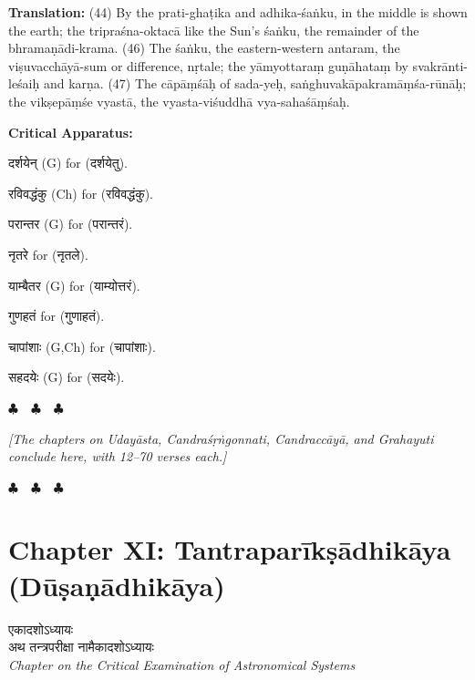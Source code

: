 \documentclass[11pt,a4paper]{article}
\newcommand{\dev}[1]{{\devanagarifont #1}}
\newenvironment{variants}{%
  \small%
  \color{varecolor}%
  \list{}{\leftmargin=2em\itemindent=-1em}%
}{\endlist}
\newcommand{\chapterend}{%
  \begin{center}%
  \textcolor{endmarkcolor}{$\clubsuit$~~$\clubsuit$~~$\clubsuit$}%
  \end{center}%
}
\begin{document}
\textbf{Translation:} (44) By the prati-ghaṭika and adhika-śaṅku, in the middle 
is shown the earth; the tripraśna-oktacā like the Sun's śaṅku, the remainder of 
the bhramaṇādi-krama. (46) The śaṅku, the eastern-western antaram, the viṣuvacchāyā-sum 
or difference, nṛtale; the yāmyottaraṃ guṇāhataṃ by svakrānti-leśaiḥ and karṇa. 
(47) The cāpāṃśāḥ of sada-yeḥ, saṅghuvakāpakramāṃśa-rūnāḥ; the vikṣepāṃśe vyastā, 
the vyasta-viśuddhā vya-sahaśāṃśaḥ.

\textcolor{varecolor}{\textbf{Critical Apparatus:}}
\begin{variants}
\item[44.1] \dev{दर्शयेन्} (G) \dev{for} (\dev{दर्शयेतु}).
\item[44.2] \dev{रविवद्धंकु} (Ch) \dev{for} (\dev{रविवद्धंकु}).
\item[46.1] \dev{परान्तर} (G) \dev{for} (\dev{परान्तरं}).
\item[46.2] \dev{नृतरे} \dev{for} (\dev{नृतले}).
\item[46.3] \dev{याम्बैतर} (G) \dev{for} (\dev{याम्योत्तरं}).
\item[46.4] \dev{गुणहतं} \dev{for} (\dev{गुणाहतं}).
\item[47.1] \dev{चापांशाः} (G,Ch) \dev{for} (\dev{चापांशाः}).
\item[47.2] \dev{सहदयेः} (G) \dev{for} (\dev{सदयेः}).
\end{variants}

\vspace{0.5cm}
\chapterend
\textit{[The chapters on Udayāsta, Candraśṛṅgonnati, Candraccāyā, and Grahayuti 
conclude here, with 12--70 verses each.]}
\chapterend

\newpage


\section*{Chapter XI: Tantraparīkṣādhikāya (Dūṣaṇādhikāya)}

\begin{center}
\dev{एकादशोऽध्यायः}\\[0.2cm]
\dev{अथ तन्त्रपरीक्षा नामैकादशोऽध्यायः}\\[0.3cm]
\textit{Chapter on the Critical Examination of Astronomical Systems}
\end{center}
\end{document}
